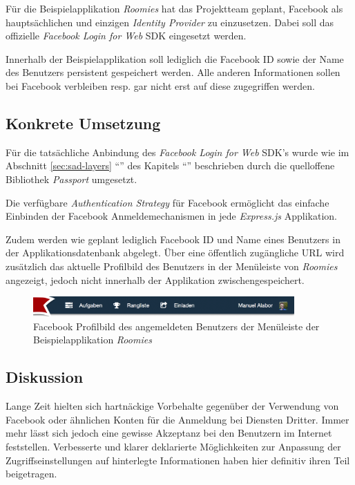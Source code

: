 Für die Beispielapplikation \emph{Roomies} hat das Projektteam geplant, Facebook als hauptsächlichen und einzigen \emph{Identity Provider} zu einzusetzen. Dabei soll das offizielle \emph{Facebook Login for Web} \cite{facebooklogin} \gls{SDK} eingesetzt werden.

Innerhalb der Beispielapplikation soll lediglich die Facebook ID sowie der Name des Benutzers persistent gespeichert werden. Alle anderen Informationen sollen bei Facebook verbleiben resp. gar nicht erst auf diese zugegriffen werden.


\subsection*{Konkrete Umsetzung}

Für die tatsächliche Anbindung des \emph{Facebook Login for Web} \cite{facebooklogin} \gls{SDK}'s wurde wie im Abschnitt \ref{sec:sad-layers} ``'' des Kapitels ``'' beschrieben durch die quelloffene Bibliothek \emph{Passport} \cite{Passportjs} umgesetzt.

Die verfügbare \emph{Authentication Strategy} für Facebook \cite{passport-facebook} ermöglicht das einfache Einbinden der Facebook Anmeldemechanismen in jede \emph{Express.js} Applikation.

Zudem werden wie geplant lediglich Facebook ID und Name eines Benutzers in der Applikationsdatenbank abgelegt. Über eine öffentlich zugängliche \gls{URL} \cite{facebook-profilepicture} wird zusätzlich das aktuelle Profilbild des Benutzers in der Menüleiste von \emph{Roomies} angezeigt, jedoch nicht innerhalb der Applikation zwischengespeichert.

\begin{figure}[H]
	\centering
	\includegraphics[width=10cm]{content/principle-demonstration/images/roomies-navigation-loggedin.png}
	\caption{Facebook Profilbild des angemeldeten Benutzers der Menüleiste der Beispielapplikation \emph{Roomies}}
	\label{fig:facebook-profilepicture-roomies}
\end{figure}


\subsection*{Diskussion}

Lange Zeit hielten sich hartnäckige Vorbehalte gegenüber der Verwendung von Facebook oder ähnlichen Konten für die Anmeldung bei Diensten Dritter. Immer mehr lässt sich jedoch eine gewisse Akzeptanz bei den Benutzern im Internet feststellen. Verbesserte und klarer deklarierte Möglichkeiten zur Anpassung der Zugriffseinstellungen auf hinterlegte Informationen \cite{facebook-authdialog} haben hier definitiv ihren Teil beigetragen.

